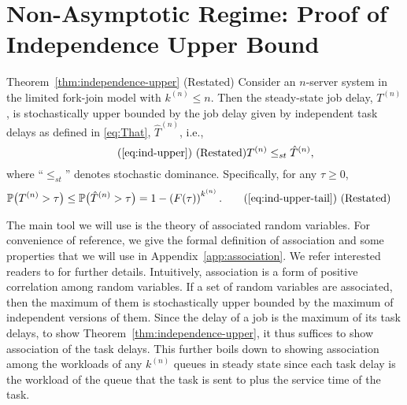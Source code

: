 \documentclass[sigconf]{acmart}
\newcommand{\thistheoremname}{}
\newtheorem*{genericthm*}{\thistheoremname}
\newenvironment{namedthm*}[1]
{\renewcommand{\thistheoremname}{#1}%
\begin{genericthm*}}
{\end{genericthm*}}
\renewcommand{\Pr}{\mathbb{P}} %
\newcommand{\supn}{^{(n)}}
\begin{document}
\section{Non-Asymptotic Regime: Proof of Independence Upper Bound}\label{sec:independence-upper}
\begin{namedthm*}{Theorem~\ref{thm:independence-upper} (Restated)}
Consider an $n$-server system in the limited fork-join model with $k\supn\le n$. Then the steady-state job delay, $T\supn$, is stochastically upper bounded by the job delay given by independent task delays as defined in \eqref{eq:That}, $\hat{T}\supn$, i.e.,
\begin{equation}\tag*{(\ref{eq:ind-upper}) (Restated)}
T\supn\le_{st} \hat{T}\supn,
\end{equation}
where ``$\le_{st}$'' denotes stochastic dominance. Specifically, for any $\tau\ge 0$,
\begin{align}
\Pr\bigl(T\supn > \tau\bigr)&\le\Pr\bigl(\hat{T}\supn > \tau\bigr) = 1-\left(F(\tau)\right)^{k\supn}.\tag*{(\ref{eq:ind-upper-tail}) (Restated)}
\end{align}
\end{namedthm*}

The main tool we will use is the theory of associated random variables. For convenience of reference, we give the formal definition of association and some properties that we will use in Appendix~\ref{app:association}.  We refer interested readers to \cite{EsaProWal_67} for further details. Intuitively, association is a form of positive correlation among random variables. If a set of random variables are associated, then the maximum of them is stochastically upper bounded by the maximum of independent versions of them. Since the delay of a job is the maximum of its task delays, to show Theorem~\ref{thm:independence-upper}, it thus suffices to show association of the task delays. This further boils down to showing association among the workloads of any $k\supn$ queues in steady state since each task delay is the workload of the queue that the task is sent to plus the service time of the task.
\end{document}
